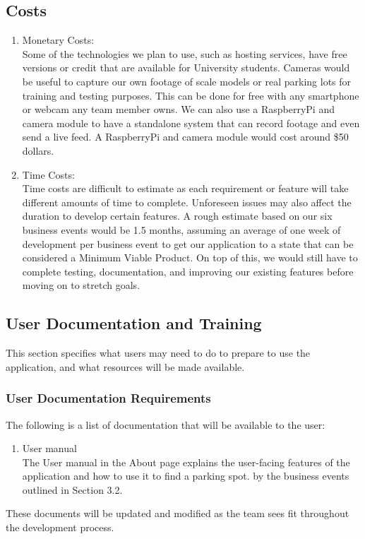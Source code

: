 \documentclass[12pt,letterpaper]{article}
\begin{document}
\subsection{Costs}
\begin{enumerate}
    \item Monetary Costs: \\
    Some of the technologies we plan to use, such as hosting services, have free
    versions or credit that are available for University students. Cameras would
    be useful to capture our own footage of scale models or real parking lots
    for training and testing purposes. This can be done for free with any
    smartphone or webcam any team member owns. We can also use a RaspberryPi and
    camera module to have a standalone system that can record footage and even
    send a live feed. A RaspberryPi and camera module would cost around \$50
    dollars.
    
    \item Time Costs: \\
    Time costs are difficult to estimate as each requirement or feature will
    take different amounts of time to complete. Unforeseen issues may also
    affect the duration to develop certain features. A rough estimate based on
    our six business events would be 1.5 months, assuming an average of one week
    of development per business event to get our application to a state that can
    be considered a Minimum Viable Product. On top of this, we would still have
    to complete testing, documentation, and improving our existing features
    before moving on to stretch goals. 
    
\end{enumerate}

\subsection{User Documentation and Training}
This section specifies what users may need to do to prepare to use the
application, and what resources will be made available.
\subsubsection{User Documentation Requirements}
The following is a list of documentation that will be available to the user:
\begin{enumerate}
    \item User manual \\
    The User manual in the About page explains the user-facing features of the
    application and how to use it to find a parking spot. %
    by the business events outlined in Section 3.2. 
\end{enumerate}
These documents will be updated and modified as the team sees fit throughout the
development process. 
\end{document}
